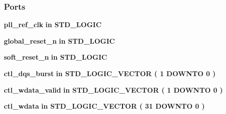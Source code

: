 \subsubsection*{Ports}
 \begin{DoxyCompactItemize}
\item 
{\bf pll\+\_\+ref\+\_\+clk}  {\bfseries {\bfseries \textcolor{keywordflow}{in}\textcolor{vhdlchar}{ }}} {\bfseries \textcolor{comment}{S\+T\+D\+\_\+\+L\+O\+G\+IC}\textcolor{vhdlchar}{ }} 
\item 
{\bf global\+\_\+reset\+\_\+n}  {\bfseries {\bfseries \textcolor{keywordflow}{in}\textcolor{vhdlchar}{ }}} {\bfseries \textcolor{comment}{S\+T\+D\+\_\+\+L\+O\+G\+IC}\textcolor{vhdlchar}{ }} 
\item 
{\bf soft\+\_\+reset\+\_\+n}  {\bfseries {\bfseries \textcolor{keywordflow}{in}\textcolor{vhdlchar}{ }}} {\bfseries \textcolor{comment}{S\+T\+D\+\_\+\+L\+O\+G\+IC}\textcolor{vhdlchar}{ }} 
\item 
{\bf ctl\+\_\+dqs\+\_\+burst}  {\bfseries {\bfseries \textcolor{keywordflow}{in}\textcolor{vhdlchar}{ }}} {\bfseries \textcolor{comment}{S\+T\+D\+\_\+\+L\+O\+G\+I\+C\+\_\+\+V\+E\+C\+T\+OR}\textcolor{vhdlchar}{ }\textcolor{vhdlchar}{(}\textcolor{vhdlchar}{ }\textcolor{vhdlchar}{ } \textcolor{vhdldigit}{1} \textcolor{vhdlchar}{ }\textcolor{keywordflow}{D\+O\+W\+N\+TO}\textcolor{vhdlchar}{ }\textcolor{vhdlchar}{ } \textcolor{vhdldigit}{0} \textcolor{vhdlchar}{ }\textcolor{vhdlchar}{)}\textcolor{vhdlchar}{ }} 
\item 
{\bf ctl\+\_\+wdata\+\_\+valid}  {\bfseries {\bfseries \textcolor{keywordflow}{in}\textcolor{vhdlchar}{ }}} {\bfseries \textcolor{comment}{S\+T\+D\+\_\+\+L\+O\+G\+I\+C\+\_\+\+V\+E\+C\+T\+OR}\textcolor{vhdlchar}{ }\textcolor{vhdlchar}{(}\textcolor{vhdlchar}{ }\textcolor{vhdlchar}{ } \textcolor{vhdldigit}{1} \textcolor{vhdlchar}{ }\textcolor{keywordflow}{D\+O\+W\+N\+TO}\textcolor{vhdlchar}{ }\textcolor{vhdlchar}{ } \textcolor{vhdldigit}{0} \textcolor{vhdlchar}{ }\textcolor{vhdlchar}{)}\textcolor{vhdlchar}{ }} 
\item 
{\bf ctl\+\_\+wdata}  {\bfseries {\bfseries \textcolor{keywordflow}{in}\textcolor{vhdlchar}{ }}} {\bfseries \textcolor{comment}{S\+T\+D\+\_\+\+L\+O\+G\+I\+C\+\_\+\+V\+E\+C\+T\+OR}\textcolor{vhdlchar}{ }\textcolor{vhdlchar}{(}\textcolor{vhdlchar}{ }\textcolor{vhdlchar}{ } \textcolor{vhdldigit}{31} \textcolor{vhdlchar}{ }\textcolor{keywordflow}{D\+O\+W\+N\+TO}\textcolor{vhdlchar}{ }\textcolor{vhdlchar}{ } \textcolor{vhdldigit}{0} \textcolor{vhdlchar}{ }\textcolor{vhdlchar}{)}\textcolor{vhdlchar}{ }} 

\end{DoxyCompactItemize}
